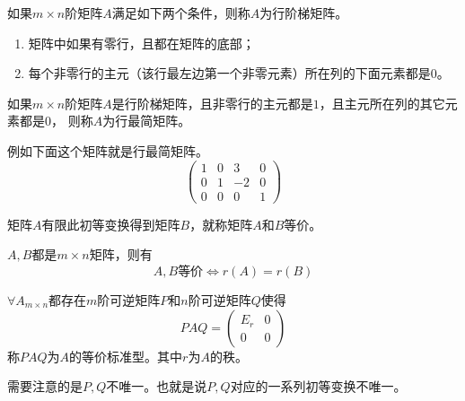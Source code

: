 \begin{definition}
    如果$m\times n$阶矩阵$A$满足如下两个条件，则称$A$为行阶梯矩阵。
    \begin{enumerate}[(1)]
        \item 矩阵中如果有零行，且都在矩阵的底部；
        \item 每个非零行的主元（该行最左边第一个非零元素）所在列的下面元素都是$0$。
    \end{enumerate}
\end{definition}
\begin{definition}
    如果$m\times n$阶矩阵$A$是行阶梯矩阵，且非零行的主元都是$1$，且主元所在列的其它元素都是$0$，
    则称$A$为行最简矩阵。
\end{definition}
例如下面这个矩阵就是行最简矩阵。
\[
    \begin{pmatrix}
        1 & 0 & 3  & 0 \\
        0 & 1 & -2 & 0 \\
        0 & 0 & 0  & 1
    \end{pmatrix}
\]

\begin{definition}
    矩阵$A$有限此初等变换得到矩阵$B$，就称矩阵$A$和$B$等价。
\end{definition}
\begin{theorem}
    $A,B$都是$m\times n$矩阵，则有
    \[ A,B\text{等价} \iff r(A) = r(B) \]
\end{theorem}

\begin{theorem}
    $\forall A_{m\times n}$都存在$m$阶可逆矩阵$P$和$n$阶可逆矩阵$Q$使得
    \[
        PAQ =
        \begin{pmatrix}
            E_r & 0 \\
            0   & 0
        \end{pmatrix}
    \]
    称$PAQ$为$A$的等价标准型。其中$r$为$A$的秩。
\end{theorem}
需要注意的是$P,Q$不唯一。也就是说$P,Q$对应的一系列初等变换不唯一。


